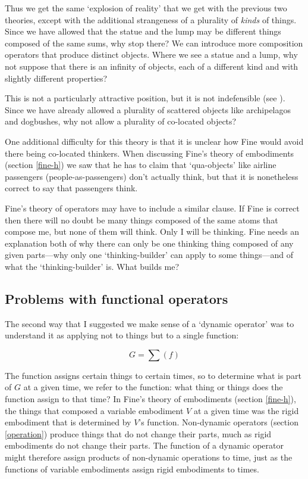 \documentclass[11pt]{article}
\begin{document}
\begin{spacing}{1.5}
Thus we get the same `explosion of reality' that we get with the
previous two theories, except with the additional strangeness of a
plurality of {\em kinds} of things.  Since we have allowed that the
statue and the lump may be different things composed of the same sums,
why stop there?  We can introduce more composition operators that
produce distinct objects.  Where we see a statue and a lump, why not
suppose that there is an infinity of objects, each of a different kind
and with slightly different properties?

This is not a particularly attractive position, but it is not
indefensible (see \citet[section 4]{bennett2004}).  Since we have
already allowed a plurality of scattered objects like archipelagos and
dogbushes, why not allow a plurality of co-located objects?


One additional difficulty for this theory is that it is unclear how
Fine would avoid there being co-located thinkers.  When discussing
Fine's theory of embodiments (section \ref{fine-h}) we saw that he has
to claim that `qua-objects' like airline passengers
(people-as-passengers) don't actually think, but that it is
nonetheless correct to say that passengers think.

Fine's theory of operators may have to include a similar clause.
If Fine is correct then there will no doubt be many things composed of
the same atoms that compose me, but none of them will think.  Only I
will be thinking.  Fine needs an explanation both of why there can
only be one thinking thing composed of any given parts---why only one
`thinking-builder' can apply to some things---and of what the
`thinking-builder' is.  What builds me?


\subsection{Problems with functional operators}
\label{op2}
The second way that I suggested we make sense of a `dynamic operator'
was to understand it as applying not to things but to a single
function:

\begin{displaymath}
G = \sum ( f )
\end{displaymath}

The function assigns certain things to certain times, so to determine
what is part of $G$ at a given time, we refer to the function: what
thing or things does the function assign to that time?  In Fine's
theory of embodiments (section \ref{fine-h}), the things that composed
a variable embodiment $V$ at a given time was the rigid embodiment
that is determined by $V$'s function.  Non-dynamic operators (section
\ref{operation}) produce things that do not change their parts, much as
rigid embodiments do not change their parts.  The function of a
dynamic operator might therefore assign products of non-dynamic
operations to time, just as the functions of variable embodiments
assign rigid embodiments to times.


\end{spacing}
\end{document}
